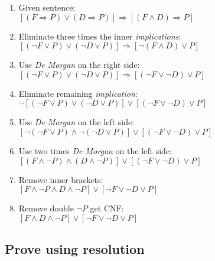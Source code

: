 \documentclass{article}
\begin{document}
\begin{enumerate}
  \item Given sentence: \\ $[(F \Longrightarrow P) \vee (D \Longrightarrow P)] \Longrightarrow [(F \wedge D) \Longrightarrow P]$
  \item Eliminate three times the inner \emph{implications}: \\ $[(\neg F \vee P) \vee (\neg D \vee P)] \Longrightarrow [\neg (F \wedge D) \vee P]$
  \item Use \emph{De Morgan} on the right side: \\ $[(\neg F \vee P) \vee (\neg D \vee P)] \Longrightarrow [(\neg F \vee \neg D) \vee P]$
  \item Eliminate remaining \emph{implication}: \\ $\neg[(\neg F \vee P) \vee (\neg D \vee P)] \vee [(\neg F \vee \neg D) \vee P]$ 
  \item Use \emph{De Morgan} on the left side: \\ $[\neg(\neg F \vee P) \wedge \neg(\neg D \vee P)] \vee [(\neg F \vee \neg D) \vee P]$ 
  \item Use two times \emph{De Morgan} on the left side: \\ $[(F \wedge \neg P) \wedge (D \wedge \neg P)] \vee [(\neg F \vee \neg D) \vee P]$ 
  \item Remove inner brackets: \\ $[F \wedge \neg P \wedge D \wedge \neg P] \vee [\neg F \vee \neg D \vee P]$ 
  \item Remove double $\neg P$ get CNF: \\ $[F \wedge D \wedge \neg P] \vee [\neg F \vee \neg D \vee P]$ 
\end{enumerate}

\subsection*{Prove using resolution}
\end{document}
